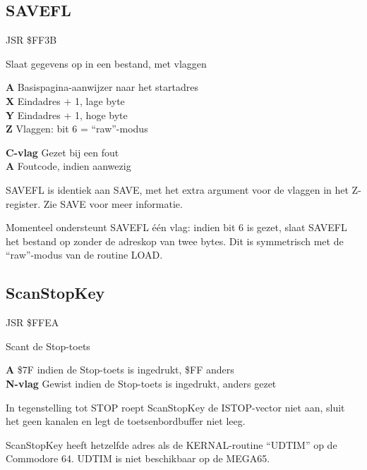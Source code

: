 \subsection{SAVEFL}
\label{KERNAL Jump Table!SAVEFL}
\begin{description}[leftmargin=2cm,style=nextline]
    \item [Adres:] JSR \$FF3B    \item [Omschrijving:] Slaat gegevens op in een bestand, met vlaggen    \item [Invoer:]        \textbf{A} Basispagina-aanwijzer naar het startadres \\        \textbf{X} Eindadres + 1, lage byte \\        \textbf{Y} Eindadres + 1, hoge byte \\        \textbf{Z} Vlaggen: bit 6 = ``raw''-modus    \item [Uitvoer:]        \textbf{C-vlag} Gezet bij een fout \\        \textbf{A} Foutcode, indien aanwezig    \item [Opmerkingen:]        SAVEFL is identiek aan SAVE, met het extra argument voor de vlaggen in het Z-register. Zie SAVE voor meer informatie.

        Momenteel ondersteunt SAVEFL één vlag: indien bit 6 is gezet, slaat SAVEFL het bestand op zonder de adreskop van twee bytes. Dit is symmetrisch met de ``raw''-modus van de routine LOAD.
\end{description}



\newpage
\subsection{ScanStopKey}
\label{KERNAL Jump Table!ScanStopKey}
\begin{description}[leftmargin=2cm,style=nextline]
    \item [Adres:] JSR \$FFEA    \item [Omschrijving:] Scant de Stop-toets    \item [Uitvoer:]        \textbf{A} \$7F indien de Stop-toets is ingedrukt, \$FF anders \\        \textbf{N-vlag} Gewist indien de Stop-toets is ingedrukt, anders gezet    \item [Opmerkingen:]        In tegenstelling tot STOP roept ScanStopKey de ISTOP-vector niet aan, sluit het geen kanalen en legt de toetsenbordbuffer niet leeg.

        ScanStopKey heeft hetzelfde adres als de KERNAL-routine ``UDTIM'' op de Commodore 64. UDTIM is niet beschikbaar op de MEGA65.    \item [Voorbeeld:]
\end{description}


